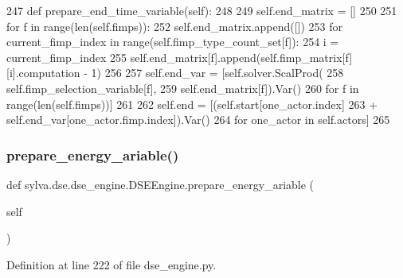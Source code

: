 \begin{DoxyCode}
247     \textcolor{keyword}{def }prepare\_end\_time\_variable(self):
248 
249         self.end\_matrix = []
250 
251         \textcolor{keywordflow}{for} f \textcolor{keywordflow}{in} range(len(self.fimps)):
252             self.end\_matrix.append([])
253             \textcolor{keywordflow}{for} current\_fimp\_index \textcolor{keywordflow}{in} range(self.fimp\_type\_count\_set[f]):
254                 i = current\_fimp\_index
255                 self.end\_matrix[f].append(self.fimp\_matrix[f][i].computation - 1)
256 
257         self.end\_var = [self.solver.ScalProd(
258             self.fimp\_selection\_variable[f],
259             self.end\_matrix[f]).Var()
260             \textcolor{keywordflow}{for} f \textcolor{keywordflow}{in} range(len(self.fimps))]
261 
262         self.end = [(self.start[one\_actor.index]
263                      + self.end\_var[one\_actor.fimp.index]).Var()
264                     \textcolor{keywordflow}{for} one\_actor \textcolor{keywordflow}{in} self.actors]
265 
\end{DoxyCode}
\mbox{\label{classsylva_1_1dse_1_1dse__engine_1_1_d_s_e_engine_a2dc4f8208c8a82370cda417fccc72a9c}} 
\subsubsection{\texorpdfstring{prepare\+\_\+energy\+\_\+ariable()}{prepare\_energy\_ariable()}}
{\footnotesize\ttfamily def sylva.\+dse.\+dse\+\_\+engine.\+D\+S\+E\+Engine.\+prepare\+\_\+energy\+\_\+ariable (\begin{DoxyParamCaption}\item[{}]{self }\end{DoxyParamCaption})}



Definition at line 222 of file dse\+\_\+engine.\+py.


